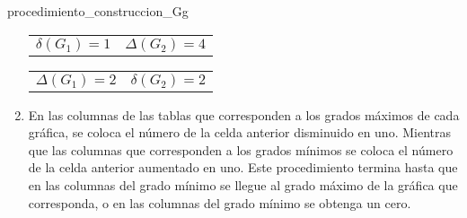 \documentclass[fleqn, 11pt]{beamer}
\begin{document}
\begin{ejemplo}[breakable, pad at break = 4mm, beforeafter skip = 3mm]{}{procedimiento_construccion_Gg}
\begin{enumerate}[1.]
            \begin{center}
                \begin{minipage}[h]{0.3\linewidth}
                    \begin{tcolorbox}[title empty, center, colframe = black!99!white, colback = white, sharp corners, hbox, left = -0.9mm, right = -0.9mm, top = -0.9mm, bottom = -0.9mm]
                        \begin{tabular}{c|c}
                            \rowcolor{gray!36!white} 
                            $ \delta(G_1) = 1 $ & $ \Delta(G_2) = 4 $ 
                        \end{tabular}
                    \end{tcolorbox}
                \end{minipage}
                \begin{minipage}[h]{0.3\linewidth}
                    \begin{tcolorbox}[title empty, center, colframe = black!99!white, colback = white, sharp corners, hbox, left = -0.9mm, right = -0.9mm, top = -0.9mm, bottom = -0.9mm]
                        \begin{tabular}{c|c}
                            \rowcolor{gray!36!white} 
                            $ \Delta(G_1) = 2 $ & $ \delta(G_2) = 2 $
                        \end{tabular}
                    \end{tcolorbox}
                \end{minipage}
            \end{center} \vspace{3mm}
            
            \item En las columnas de las tablas que corresponden a los grados máximos de cada gráfica, se coloca el número de la celda anterior disminuido en uno. Mientras que las columnas que corresponden a los grados mínimos se coloca el número de la celda anterior aumentado en uno. Este procedimiento termina hasta que en las columnas del grado mínimo se llegue al grado máximo de la gráfica que corresponda, o en las columnas del grado mínimo se obtenga un cero. \vspace{3mm}
            

\end{enumerate}
\end{ejemplo}
\end{document}
